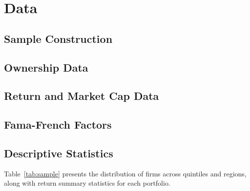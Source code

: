 \section{Data}
\label{sec:data}

\subsection{Sample Construction}
\label{sec:data-sample}


\subsection{Ownership Data}
\label{sec:data-ownership}


\subsection{Return and Market Cap Data}
\label{sec:data-returns}


\subsection{Fama-French Factors}
\label{sec:data-factors}


\subsection{Descriptive Statistics}
\label{sec:data-descriptive}

Table~\ref{tab:sample} presents the distribution of firms across quintiles and regions,
along with return summary statistics for each portfolio.

